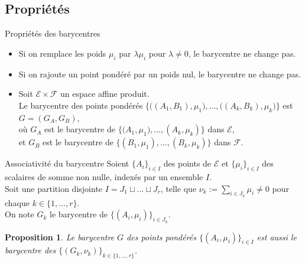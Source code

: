 \documentclass[aspectratio=1610 %
]{beamer}
\newtheorem{proposition}[theorem]{Proposition}
\let\ens\mathcal
\begin{document}
\subsection{Propriétés}
  \begin{frame}{Propriétés des barycentres}
    \begin{itemize}[<+(1)->]
      \item Si on remplace les poids $\mu_{i}$ par $\lambda\mu_{i}$ pour $\lambda \neq 0$, le barycentre ne change pas.
      \item Si on rajoute un point pondéré par un poids nul, le barycentre ne change pas.
      \item Soit $\ens{E} \times \ens{F}$ un espace affine produit.\\
      Le barycentre des points pondérés $\{\big((A_{1},B_{1}),\mu_{1}\big),\ldots,\big((A_{k},B_{k}),\mu_{k}\big)\}$ est $G=(G_{A},G_{B})$,\\
      où $G_{A}$ est le barycentre de $\{(A_{1},\mu_{1}\big),\ldots,(A_{k},\mu_{k})\}$ dans $\ens{E}$,\\
      et $G_{B}$ est le barycentre de $\{(B_{1},\mu_{1}),\ldots,(B_{k},\mu_{k})\}$ dans $\ens{F}$.
    \end{itemize}
  \end{frame}
  \begin{frame}{Associativité du barycentre}
    Soient $\{A_{i}\}_{i \in I}$ des points de $\ens{E}$ et $\{\mu_{i}\}_{i \in I}$ des scalaires de somme non nulle, indexés par un  ensemble $I$.\pause\\
    Soit une partition disjointe $I =J_{1} \sqcup\dots\sqcup J_{r}$, telle que $\nu_{k}:=\sum_{i \in J_{k}}\mu_{i} \neq 0$ pour chaque $k \in \{1,\ldots,r\}$.\pause\\
    On note $G_{k}$ le barycentre de $\{(A_{i},\mu_{i})\}_{i \in J_{k}}$.\pause
    \begin{proposition}
      Le barycentre $G$ des points pondérés $\{(A_{i},\mu_{i})\}_{i \in I}$ est aussi le barycentre des $\{(G_{k},\nu_{k})\}_{k \in \{1,\ldots,r\}}$.
    \end{proposition}
  \end{frame}
\end{document}
